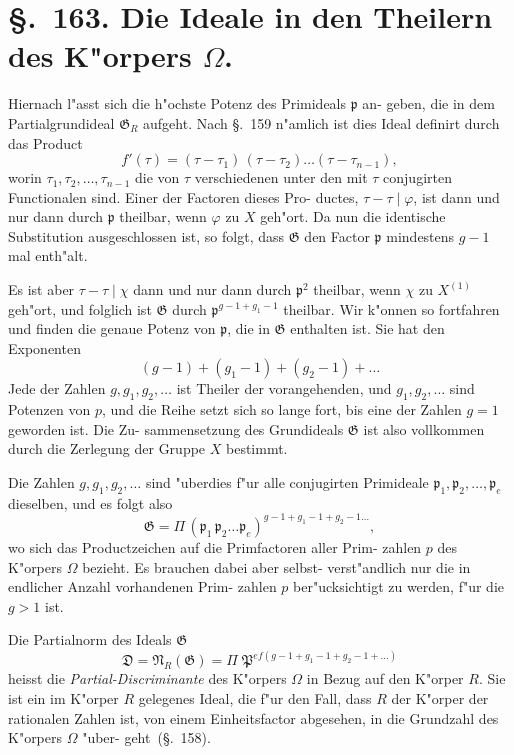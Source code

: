 \documentclass[12pt,a4paper]{article}
\theoremstyle{weber}
\begin{document}
\newpage
\section*{\S.~163. Die Ideale in den Theilern des K"orpers $\varOmega$.}

Hiernach l"asst sich die h"ochste Potenz des Primideals $\mathfrak{p}$ an-
geben, die in dem Partialgrundideal $\mathfrak{G}_R$ aufgeht. Nach \S.~159
n"amlich ist dies Ideal definirt durch das Product
\[
f'(\tau) = (\tau-\tau_1)\,(\tau-\tau_2)\dots(\tau-\tau_{n-1}),
\]
worin $\tau_1, \tau_2, \dots, \tau_{n-1}$ die von $\tau$ verschiedenen unter den mit $\tau$
conjugirten Functionalen sind. Einer der Factoren dieses Pro-
ductes, $\tau - \tau \mid \varphi$, ist dann und nur dann durch $\mathfrak{p}$ theilbar, wenn
$\varphi$ zu $X$ geh"ort. Da nun die identische Substitution ausgeschlossen
ist, so folgt, dass $\mathfrak{G}$ den Factor $\mathfrak{p}$ mindestens $g-1$ mal enth"alt.

Es ist aber $\tau - \tau \mid \chi$ dann und nur dann durch $\mathfrak{p}^2$ theilbar,
wenn $\chi$ zu $X^{(1)}$ geh"ort, und folglich ist $\mathfrak{G}$ durch $\mathfrak{p}^{g-1+g_1-1}$
theilbar. Wir k"onnen so fortfahren und finden die genaue Potenz
von $\mathfrak{p}$, die in $\mathfrak{G}$ enthalten ist. Sie hat den Exponenten
\[
(g-1) + (g_1-1) + (g_2-1) + \dots
\]
Jede der Zahlen $g, g_1, g_2, \dots$ ist Theiler der vorangehenden,
und $g_1, g_2, \dots$ sind Potenzen von $p$, und die Reihe setzt sich so
lange fort, bis eine der Zahlen $g = 1$ geworden ist. Die Zu-
sammensetzung des Grundideals $\mathfrak{G}$ ist also vollkommen durch
die Zerlegung der Gruppe $X$ bestimmt.

Die Zahlen $g, g_1, g_2, \dots$ sind "uberdies f"ur alle conjugirten
Primideale $\mathfrak{p}_1, \mathfrak{p}_2, \dots, \mathfrak{p}_e$ dieselben, und es folgt also
\[
\mathfrak{G} = \varPi\,(\mathfrak{p}_1\,\mathfrak{p}_2\dots\mathfrak{p}_e)^{g-1+g_1-1+g_2-1\dots},
\]
wo sich das Productzeichen auf die Primfactoren aller Prim-
zahlen $p$ des K"orpers $\varOmega$ bezieht. Es brauchen dabei aber selbst-
verst"andlich nur die in endlicher Anzahl vorhandenen Prim-
zahlen $p$ ber"ucksichtigt zu werden, f"ur die $g > 1$ ist.

Die Partialnorm des Ideals $\mathfrak{G}$
\[
\mathfrak{D} = \mathfrak{N}_R(\mathfrak{G}) = \varPi\;\mathfrak{P}^{ef(g-1+g_1-1+g_2-1+\dots)}
\]
heisst die \emph{Partial-Discriminante} des K"orpers $\varOmega$ in Bezug auf den
K"orper $R$. Sie ist ein im K"orper $R$ gelegenes Ideal, die f"ur den
Fall, dass $R$ der K"orper der rationalen Zahlen ist, von einem
Einheitsfactor abgesehen, in die Grundzahl des K"orpers $\varOmega$ "uber-
geht~(\S.~158).
\end{document}

